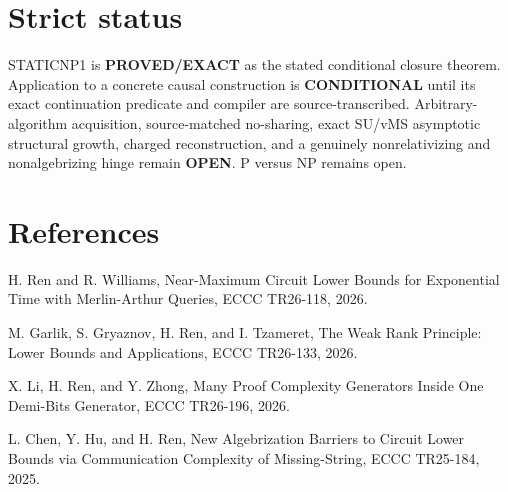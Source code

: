 \documentclass[11pt]{article}
\begin{document}
\section*{Strict status}
STATICNP1 is \textbf{PROVED/EXACT} as the stated conditional closure theorem. Application to a concrete causal construction is \textbf{CONDITIONAL} until its exact continuation predicate and compiler are source-transcribed. Arbitrary-algorithm acquisition, source-matched no-sharing, exact SU/vMS asymptotic structural growth, charged reconstruction, and a genuinely nonrelativizing and nonalgebrizing hinge remain \textbf{OPEN}. P versus NP remains open.

\section*{References}
H. Ren and R. Williams, Near-Maximum Circuit Lower Bounds for Exponential Time with Merlin-Arthur Queries, ECCC TR26-118, 2026.

M. Garlik, S. Gryaznov, H. Ren, and I. Tzameret, The Weak Rank Principle: Lower Bounds and Applications, ECCC TR26-133, 2026.

X. Li, H. Ren, and Y. Zhong, Many Proof Complexity Generators Inside One Demi-Bits Generator, ECCC TR26-196, 2026.

L. Chen, Y. Hu, and H. Ren, New Algebrization Barriers to Circuit Lower Bounds via Communication Complexity of Missing-String, ECCC TR25-184, 2025.
\end{document}
